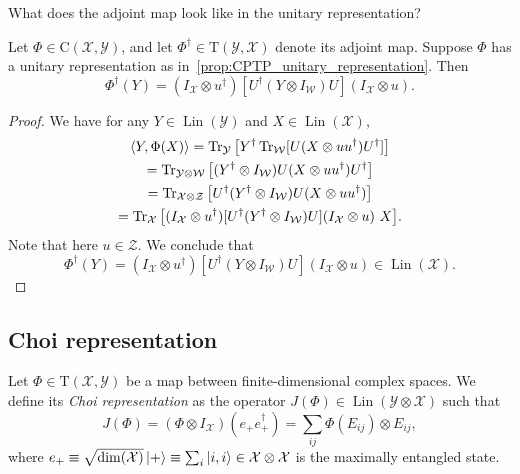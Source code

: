 \documentclass[12pt]{report}
\newcommand{\calY}{{\mathcal{Y}}}
\newcommand{\calW}{{\mathcal{W}}}
\newcommand{\calX}{{\mathcal{X}}}
\newcommand{\calZ}{{\mathcal{Z}}}
\newcommand{\rmC}{{\mathrm{C}}}
\newcommand{\rmT}{{\mathrm{T}}}
\DeclareMathOperator{\Lin}{Lin}
\begin{document}
What does the adjoint map look like in the unitary representation?

\begin{prop}
	Let $\Phi\in\rmC(\calX,\calY)$, and let $\Phi^\dagger\in\rmT(\calY,\calX)$ denote its adjoint map.
	Suppose $\Phi$ has a unitary representation as in~\cref{prop:CPTP_unitary_representation}.
	Then
	\begin{equation}
		\Phi^\dagger(Y) =
		(I_{\calX}\otimes u^\dagger)
		[U^\dagger (Y\otimes I_{\calW}) U]
		(I_{\calX}\otimes u).
	\end{equation}
\end{prop}
\begin{proof}
	We have for any $Y\in\Lin(\calY)$ and $X\in\Lin(\calX)$,
	\begin{equation}
	\begin{gathered}
		\langle Y,\Phi(X)\rangle
		= \Tr_\calY\big[Y^\dagger \Tr_\calW[U(X\otimes uu^\dagger)U^\dagger]\big] \\
		= \Tr_{\calY\otimes\calW} \big[
		(Y^\dagger\otimes I_{\calW}) U (X\otimes uu^\dagger) U^\dagger
		\big] \\
		= \Tr_{\calX\otimes\calZ} \big[
		U^\dagger (Y^\dagger\otimes I_{\calW}) U (X\otimes uu^\dagger)
		\big] \\
		= \Tr_{\calX} \big[
		(I_\calX\otimes u^\dagger) [
			U^\dagger (Y^\dagger\otimes I_{\calW}) U
		] (I_\calX\otimes u) \,\, X
		\big].
	\end{gathered}
	\end{equation}
	Note that here $u\in\calZ$. We conclude that
	\begin{equation}
		\Phi^\dagger(Y) =
		(I_{\calX}\otimes u^\dagger)
		[U^\dagger (Y\otimes I_{\calW}) U]
		(I_{\calX}\otimes u)
		\in\Lin(\calX).
	\end{equation}
\end{proof}

\subsection{Choi representation}

\begin{defn}
	Let $\Phi\in\rmT(\calX,\calY)$ be a map between finite-dimensional complex spaces.
	We define its \emph{Choi representation} as the operator $J(\Phi)\in\Lin(\calY\otimes\calX)$ such that
	\begin{equation}
		J(\Phi) = (\Phi\otimes I_{\calX})(e_+ e_+^\dagger)
		= \sum_{ij} \Phi(E_{ij})\otimes E_{ij},
	\end{equation}
	where $e_+\equiv \sqrt{\dim(\calX)}\ket+\equiv \sum_i \ket{i,i}\in\calX\otimes\calX$ is the maximally entangled state.
\end{defn}
\end{document}
